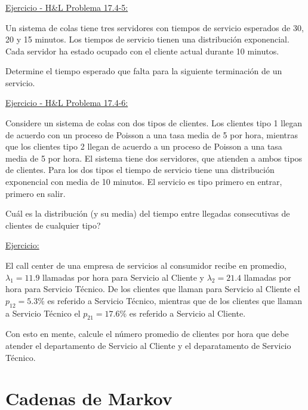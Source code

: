 \documentclass[ 10pt, xcolor = dvipsnames]{beamer}
\begin{document}
\begin{frame}[allowframebreaks]
\frametitle{\insertsection}

\underline{Ejercicio - H\&L Problema 17.4-5:}

Un sistema de colas tiene tres servidores con tiempos de servicio esperados de 30, 20 y 15 minutos. Los tiempos de servicio tienen una distribuci\'on exponencial. Cada servidor ha estado ocupado con el cliente actual durante 10 minutos. 

Determine el tiempo esperado que falta para la siguiente terminaci\'on de un servicio. 

\framebreak

\underline{Ejercicio - H\&L Problema 17.4-6:}

Considere un sistema de colas con dos tipos de clientes. Los clientes tipo 1 llegan de acuerdo con un proceso de Poisson a una tasa media de 5 por hora, mientras que los clientes tipo 2 llegan de acuerdo a un proceso de Poisson a una tasa media de 5 por hora. El sistema tiene dos servidores, que atienden a ambos tipos de clientes. Para los dos tipos el tiempo de servicio tiene una distribuci\'on exponencial con media de 10 minutos. El servicio es tipo primero en entrar, primero en salir. 

Cu\'al es la distribuci\'on (y su media) del tiempo entre llegadas consecutivas de clientes de cualquier tipo?

\framebreak

\underline{Ejercicio:}

El call center de una empresa de servicios al consumidor recibe en promedio, $\lambda_1 = 11.9$ llamadas por hora para Servicio al Cliente y $\lambda_2 = 21.4$ llamadas por hora para Servicio T\'ecnico. De los clientes que llaman para Servicio al Cliente el $p_{12} = 5.3\%$ es referido a Servicio T\'ecnico, mientras que de los clientes que llaman a Servicio T\'ecnico el $p_{21} = 17.6\%$ es referido a Servicio al Cliente.

Con esto en mente, calcule el n\'umero promedio de clientes por hora que debe atender el departamento de Servicio al Cliente y el deparatamento de \linebreak Servicio T\'ecnico. 

\end{frame}

\section{Cadenas de Markov}
\end{document}
